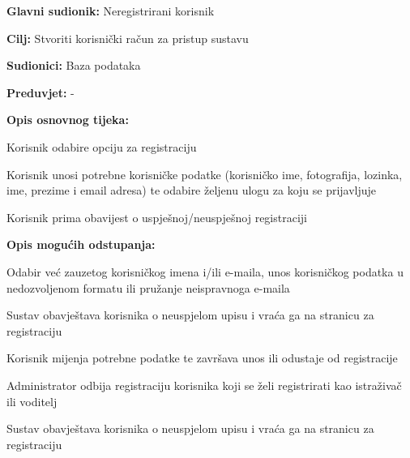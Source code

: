 					\noindent {}
					\begin{packed_item}
	
						\item \textbf{Glavni sudionik: }Neregistrirani korisnik
						\item  \textbf{Cilj:} Stvoriti korisnički račun za pristup sustavu
						\item  \textbf{Sudionici:} Baza podataka
						\item  \textbf{Preduvjet:} -
						\item  \textbf{Opis osnovnog tijeka:}
						
						\item[] \begin{packed_enum}
	
							\item Korisnik odabire opciju za registraciju  
							\item Korisnik unosi potrebne korisničke podatke (korisničko ime, fotografija, lozinka, ime, prezime i email adresa) te odabire željenu ulogu za koju se prijavljuje 
							\item Korisnik prima obavijest o uspješnoj/neuspješnoj registraciji
						\end{packed_enum}
						
						\item  \textbf{Opis mogućih odstupanja:}
						
						\item[] \begin{packed_item}
	
							\item[2.a] Odabir već zauzetog korisničkog imena i/ili e-maila, unos korisničkog podatka u nedozvoljenom formatu ili pružanje neispravnoga e-maila 
							\item[] \begin{packed_enum}
								
								\item Sustav obavještava korisnika o neuspjelom upisu i vraća ga na stranicu za registraciju 
								\item Korisnik mijenja potrebne podatke te završava unos ili odustaje od registracije 
								
							\end{packed_enum}
							\item[3.a] Administrator odbija registraciju korisnika koji se želi registrirati kao istraživač ili voditelj
							\item[] \begin{packed_enum}
								
								\item Sustav obavještava korisnika o neuspjelom upisu i vraća ga na stranicu za registraciju 
								
							\end{packed_enum}
							
						\end{packed_item}
					\end{packed_item}
				
